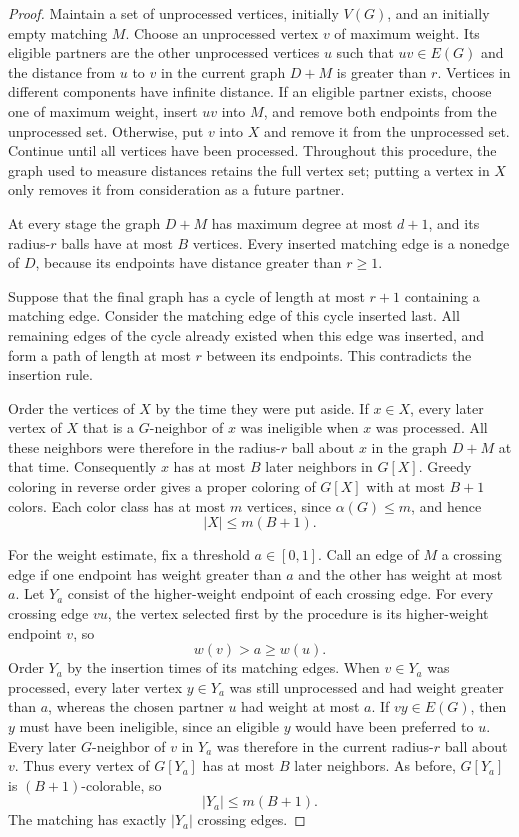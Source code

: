 \documentclass[11pt]{article}
\begin{document}
\begin{proof} Maintain a set of unprocessed vertices, initially \(V(G)\), and an
 initially empty matching \(M\). Choose an unprocessed vertex \(v\) of maximum weight.
 Its eligible partners are the other unprocessed vertices \(u\) such that \(uv\in E(G)\)
 and the distance from \(u\) to \(v\) in the current graph \(D+M\) is greater than
 \(r\). Vertices in different components have infinite distance. If an eligible partner
 exists, choose one of maximum weight, insert \(uv\) into \(M\), and remove both
 endpoints from the unprocessed set. Otherwise, put \(v\) into \(X\) and remove it from
 the unprocessed set. Continue until all vertices have been processed. Throughout this
 procedure, the graph used to measure distances retains the full vertex set; putting a
 vertex in \(X\) only removes it from consideration as a future partner.

At every stage the graph \(D+M\) has maximum degree at most \(d+1\), and its
 radius-\(r\) balls have at most \(B\) vertices. Every inserted matching edge is a
 nonedge of \(D\), because its endpoints have distance greater than \(r\ge1\).

Suppose that the final graph has a cycle of length at most \(r+1\) containing a matching
 edge. Consider the matching edge of this cycle inserted last. All remaining edges of
 the cycle already existed when this edge was inserted, and form a path of length at
 most \(r\) between its endpoints. This contradicts the insertion rule.

Order the vertices of \(X\) by the time they were put aside. If \(x\in X\), every later
 vertex of \(X\) that is a \(G\)-neighbor of \(x\) was ineligible when \(x\) was
 processed. All these neighbors were therefore in the radius-\(r\) ball about \(x\) in
 the graph \(D+M\) at that time. Consequently \(x\) has at most \(B\) later neighbors in
 \(G[X]\). Greedy coloring in reverse order gives a proper coloring of \(G[X]\) with at
 most \(B+1\) colors. Each color class has at most \(m\) vertices, since \(\alpha(G)\le
 m\), and hence \[
|X|\le m(B+1).
\]

For the weight estimate, fix a threshold \(a\in[0,1]\). Call an edge of \(M\) a crossing
 edge if one endpoint has weight greater than \(a\) and the other has weight at most
 \(a\). Let \(Y_a\) consist of the higher-weight endpoint of each crossing edge. For
 every crossing edge \(vu\), the vertex selected first by the procedure is its
 higher-weight endpoint \(v\), so \[
w(v)>a\ge w(u).
\] Order \(Y_a\) by the insertion times of its matching edges. When \(v\in Y_a\) was
 processed, every later vertex \(y\in Y_a\) was still unprocessed and had weight greater
 than \(a\), whereas the chosen partner \(u\) had weight at most \(a\). If \(vy\in
 E(G)\), then \(y\) must have been ineligible, since an eligible \(y\) would have been
 preferred to \(u\). Every later \(G\)-neighbor of \(v\) in \(Y_a\) was therefore in the
 current radius-\(r\) ball about \(v\). Thus every vertex of \(G[Y_a]\) has at most
 \(B\) later neighbors. As before, \(G[Y_a]\) is \((B+1)\)-colorable, so \[
|Y_a|\le m(B+1).
\] The matching has exactly \(|Y_a|\) crossing edges.


\end{proof}
\end{document}

